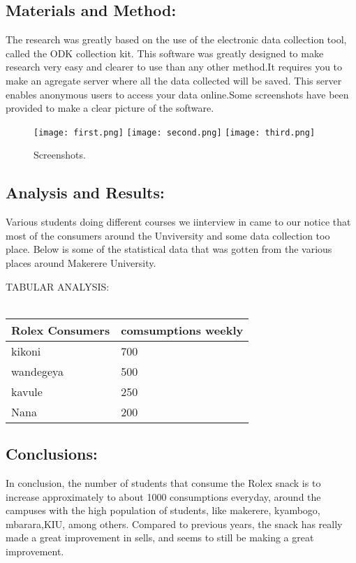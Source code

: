 \documentclass{article}
\begin{document}
  \begin{center}
\section{  Materials and Method:}
\vspace{5mm}
The research was greatly based on the use of the electronic data collection tool, called the ODK collection kit. This software was greatly designed to make research very easy and clearer to use than any other method.\newline It requires you to make an agregate server  where all the data collected will be saved. This server enables anonymous users to access your data online.\newline Some screenshots have been provided to make a clear picture of the software.
 \newline  
\begin{figure}
\texttt{[image: first.png]}
\texttt{[image: second.png]}
\texttt{[image: third.png]}
\caption{Screenshots.}
\label{fig: Screenshots}
\end{figure}
\end{center}
\begin{center}
\section{  Analysis and Results:}
\vspace{5mm}
Various students doing different courses we iinterview in came to our notice that most of the consumers around the Unviversity and some data collection too place.
 Below is some of the statistical data that was  gotten from the various places around Makerere University.
\end{center}
TABULAR ANALYSIS:
\\
\\
\begin{tabu} to 1.0\textwidth{ | X[1] | X[c] | }
\hline
Rolex Consumers &  comsumptions weekly \\
\hline
kikoni & 700\\
\hline
wandegeya & 500\\
\hline
kavule & 250\\
\hline
Nana & 200\\
\hline
\end{tabu}
\begin{center}
\section{ Conclusions:}
 \vspace{5mm}
In conclusion, the number of students that consume the Rolex snack is to increase approximately to about 1000 consumptions everyday, around the 
campuses with the high population of students, like makerere, kyambogo, mbarara,KIU, among others.
 \newline Compared to previous years, the snack has really made a great improvement in sells, and seems to still be making a great improvement.
\end{center}
\end{document}
